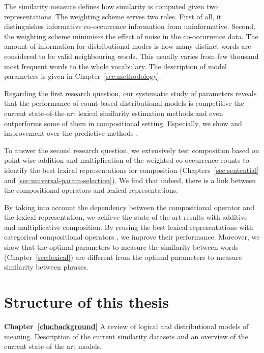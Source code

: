 The similarity measure defines how similarity is computed given two representations. The weighting scheme serves two roles. First of all, it distinguishes informative co-occurrence information from uninformative. Second, the weighting scheme minimises the effect of noise in the co-occurrence data. The amount of information for distributional modes is how many distinct words are considered to be valid neighbouring words. This usually varies from few thousand most frequent words to the whole vocabulary.  The description of model parameters is given in Chapter~\ref{sec:methodology}.

Regarding the first research question, our systematic study of parameters reveals that the performance of count-based distributional models is competitive the current state-of-the-art lexical similarity estimation methods and even outperforms some of them in compositional setting. Especially, we show and improvement over the predictive methods \cite{mikolov2013linguistic,mikolov2013distributed,mikolov2013efficient}.

To answer the second research question, we extensively test composition based on point-wise addition and multiplication of the weighted co-occurrence counts to identify the best lexical representations for composition (Chapters~\ref{sec:sentential} and \ref{sec:universal-param-selection}). We find that indeed, there is a link between the compositional operators and lexical representations.

By taking into account the dependency between the compositional operator and the lexical representation,  we achieve the state of the art results with additive and multiplicative composition. By reusing the best lexical representations with categorical compositional operators \cite{DBLP:journals/corr/abs-1003-4394}, we improve their performance. Moreover, we show that the optimal parameters to measure the similarity between words (Chapter~\ref{sec:lexical}) are different from the optimal parameters to measure similarity between phrases.

\section{Structure of this thesis}
\label{sec:structure}

\textbf{Chapter~\ref{cha:background}} A review of logical and distributional models of meaning. Description of the current similarity datasets and an overview of the current state of the art models.

